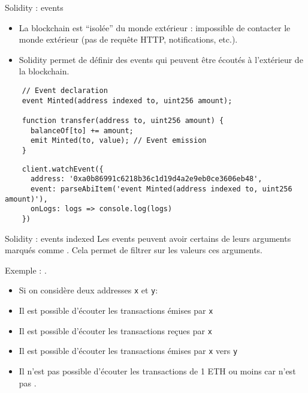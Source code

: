 \begin{frame}[fragile]{Solidity : events}
  \begin{itemize}
    \item La blockchain est \enquote{isolée} du monde extérieur : impossible de contacter le monde extérieur (pas de requête HTTP, notifications, etc.).
    \item Solidity permet de définir des events qui peuvent être écoutés à l'extérieur de la blockchain.
  \end{itemize}

  \begin{verbatim}
    // Event declaration
    event Minted(address indexed to, uint256 amount);

    function transfer(address to, uint256 amount) {
      balanceOf[to] += amount;
      emit Minted(to, value); // Event emission
    }
  \end{verbatim}

  \begin{verbatim}
    client.watchEvent({
      address: '0xa0b86991c6218b36c1d19d4a2e9eb0ce3606eb48',
      event: parseAbiItem('event Minted(address indexed to, uint256 amount)'), 
      onLogs: logs => console.log(logs)
    })
  \end{verbatim}
\end{frame}

\begin{frame}[fragile]{Solidity : events indexed}
  Les events peuvent avoir certains de leurs arguments marqués comme .
  Cela permet de filtrer sur les valeurs ces arguments.

  Exemple : .

  \begin{itemize}
    \item Si on considère deux addresses \texttt{x} et \texttt{y}:
    \item Il est possible d'écouter les transactions émises par \texttt{x}
    \item Il est possible d'écouter les transactions reçues par \texttt{x}
    \item Il est possible d'écouter les transactions émises par \texttt{x} vers \texttt{y}
    \item Il n'est pas possible d'écouter les transactions de 1 ETH ou moins car  n'est pas .

  \end{itemize}
\end{frame}

